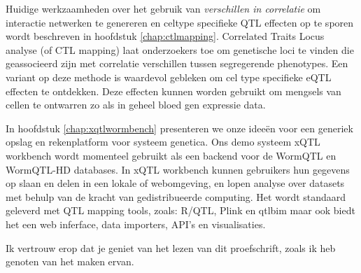 Huidige werkzaamheden over het gebruik van \emph{verschillen in correlatie} om interactie 
netwerken te genereren en celtype specifieke QTL effecten op te sporen wordt beschreven in 
hoofdstuk \ref{chap:ctlmapping}. Correlated Traits Locus analyse (of CTL mapping) laat 
onderzoekers toe om genetische loci te vinden die geassocieerd zijn met correlatie verschillen 
tussen segregerende phenotypes. Een variant op deze methode is waardevol gebleken om cel 
type specifieke eQTL effecten te ontdekken. Deze effecten kunnen worden gebruikt om mengsels 
van cellen te ontwarren zo als in geheel bloed gen expressie data.

In hoofdstuk \ref{chap:xqtlwormbench} presenteren we onze idee\"en voor een generiek opslag en rekenplatform 
voor systeem genetica. Ons demo systeem xQTL workbench wordt momenteel gebruikt als een 
backend voor de WormQTL en WormQTL-HD databases. In xQTL workbench kunnen gebruikers hun 
gegevens op slaan en delen in een lokale of webomgeving, en lopen analyse over datasets met 
behulp van de kracht van gedistribueerde computing. Het wordt standaard geleverd met QTL 
mapping tools, zoals: R/QTL, Plink en qtlbim maar ook biedt het een web inferface, data 
importers, API's en visualisaties.

Ik vertrouw erop dat je geniet van het lezen van dit proefschrift, zoals ik heb genoten van het maken 
ervan.

\newpage
